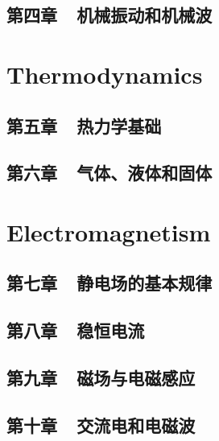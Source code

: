 \documentclass[12pt,a4paper]{book}
\begin{document}
\chapter{第四章~~机械振动和机械波}


\part{Thermodynamics}

\chapter{第五章~~热力学基础}


\chapter{第六章~~气体、液体和固体}


\part{Electromagnetism}

\chapter{第七章~~静电场的基本规律}


\chapter{第八章~~稳恒电流}


\chapter{第九章~~磁场与电磁感应}


\chapter{第十章~~交流电和电磁波}


\nocite{*}

\end{document}
